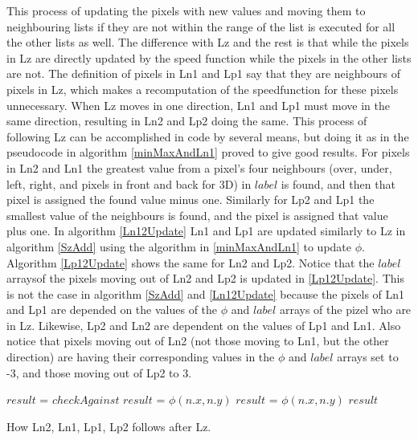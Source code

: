 This process of updating the pixels with new values and moving them to neighbouring lists if they are not within the range of the list is executed for all the other lists as well. The difference with Lz and the rest is that while the pixels in Lz are directly updated by the speed function while the pixels in the other lists are not. The definition of pixels in Ln1 and Lp1 say that they are neighbours of pixels in Lz, which makes a recomputation of the speedfunction for these pixels unnecessary. When Lz moves in one direction, Ln1 and Lp1 must move in the same direction, resulting in Ln2 and Lp2 doing the same. This process of following Lz can be accomplished in code by several means, but doing it as in the pseudocode in algorithm \ref{minMaxAndLn1} proved to give good results. For pixels in Ln2 and Ln1 the greatest value from a pixel's four neighbours (over, under, left, right, and pixels in front and back for 3D) in $label$ is found, and then that pixel is assigned the found value minus one. Similarly for Lp2 and Lp1 the smallest value of the neighbours is found, and the pixel is assigned that value plus one. In algorithm \ref{Ln12Update} Ln1 and Lp1 are updated similarly to Lz in algorithm \ref{SzAdd} using the algorithm in \ref{minMaxAndLn1} to update $\phi$. Algorithm \ref{Lp12Update} shows the same for Ln2 and Lp2. Notice that the $label$ arraysof the pixels moving out of Ln2 and Lp2 is updated in \ref{Lp12Update}. This is not the case in algorithm \ref{SzAdd} and \ref{Ln12Update} because the pixels of Ln1 and Lp1 are depended on the values of the $\phi$ and $label$ arrays of the pizel who are in Lz. Likewise, Lp2 and Ln2 are dependent on the values of Lp1 and Ln1. Also notice that pixels moving out of Ln2 (not those moving to Ln1, but the other direction) are having their corresponding values in the $\phi$ and $label$ arrays set to -3, and those moving out of Lp2 to 3.

\begin{algorithm}[h!]
\begin{algorithmic}[1]
\Statex {}
\State $result$ = $checkAgainst$
 
		\Statex {}
	  		\State $result$ = $\phi(n.x, n.y)$
	  	\EndIf
	\EndFor
\EndIf
{}  
	  		\State $result$ = $\phi(n.x, n.y)$
	  	\EndIf
	\EndFor
\EndIf
\Return $result$
\EndProcedure
\end{algorithmic}
\caption{How Ln2, Ln1, Lp1, Lp2 follows after Lz.}
\label{minMaxAndLn1}
\end{algorithm}

